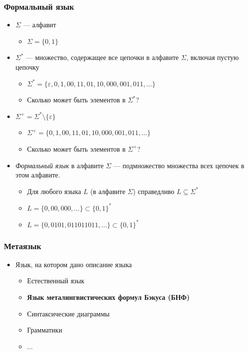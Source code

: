 \documentclass{beamer}
\begin{document}
\begin{frame}[fragile]
  \transwipe[direction=90]
  \frametitle{Формальный язык}
  \begin{itemize}
    \item $\Sigma$ --- алфавит
    \begin{itemize}
      \item $\Sigma = \{ 0, 1 \}$
    \end{itemize}
    \item $\Sigma^*$ --- множество, содержащее все цепочки в алфавите $\Sigma$, включая пустую цепочку
    \begin{itemize}
      \item $\Sigma^*=  \{ \varepsilon, 0, 1, 00, 11, 01, 10, 000, 001, 011, ... \}$
      \item Сколько может быть элементов в $\Sigma^*$?
      \pause
    \end{itemize}
    \item $\Sigma^+ = \Sigma^* \setminus \{ \varepsilon \} $
    \begin{itemize}
      \item $\Sigma^+ = \{0, 1, 00, 11, 01, 10, 000, 001, 011, \dots \}$
      \item Сколько может быть элементов в $\Sigma^+$?
      \pause
    \end{itemize}
  \end{itemize}
  \begin{itemize}
    \item \emph{Формальный язык} в алфавите $\Sigma$ --- подмножество множества всех цепочек в этом алфавите.
    \begin{itemize}
      \item Для любого языка $L$ (в алфавите $\Sigma$) справедливо $L \subseteq \Sigma^*$
      \item $L = \{ 0, 00, 000, \dots\} \subset \{0, 1\}^*$
      \item $L = \{ 0, 0101, 011011011, \dots\} \subset \{0, 1\}^*$
    \end{itemize}
  \end{itemize}
\end{frame}

\begin{frame}[fragile]
  \transwipe[direction=90]
  \frametitle{Метаязык}
  \begin{itemize}
    \item Язык, на котором дано описание языка
    \begin{itemize}
      \item Естественный язык
      \pause
      \item \textbf<5>{Язык металингвистических формул Бэкуса (БНФ)}
      \pause \item Синтаксические диаграммы
      \pause \item Грамматики
      \item $\dots$
    \end{itemize}
  \end{itemize}
\end{frame}
\end{document}
